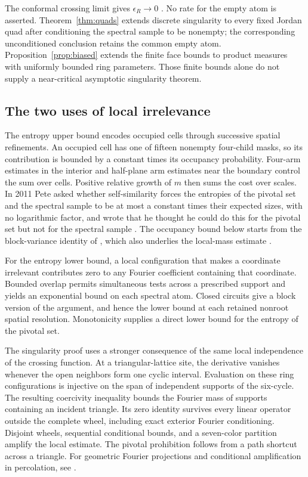 \documentclass[11pt]{amsart}
\theoremstyle{remark}
\begin{document}
The conformal crossing limit gives $\epsilon_R\to0$ \cite{Smirnov}. No rate for the empty atom is asserted. Theorem~\ref{thm:quads} extends discrete singularity to every fixed Jordan quad after conditioning the spectral sample to be nonempty; the corresponding unconditioned conclusion retains the common empty atom. Proposition~\ref{prop:biased} extends the finite face bounds to product measures with uniformly bounded ring parameters. Those finite bounds alone do not supply a near-critical asymptotic singularity theorem.

\subsection{The two uses of local irrelevance}

The entropy upper bound encodes occupied cells through successive spatial refinements. An occupied cell has one of fifteen nonempty four-child masks, so its contribution is bounded by a constant times its occupancy probability. Four-arm estimates in the interior and half-plane arm estimates near the boundary control the sum over cells. Positive relative growth of $m$ then sums the cost over scales. In 2011 Pete asked whether self-similarity forces the entropies of the pivotal set and the spectral sample to be at most a constant times their expected sizes, with no logarithmic factor, and wrote that he thought he could do this for the pivotal set but not for the spectral sample \cite[slides~21--22]{Pete}. The occupancy bound below starts from the block-variance identity of \cite[Lemma~2.2]{GPS}, which also underlies the local-mass estimate \cite[Lemma~3.2 and equation~(3.7)]{GPS}.

For the entropy lower bound, a local configuration that makes a coordinate irrelevant contributes zero to any Fourier coefficient containing that coordinate. Bounded overlap permits simultaneous tests across a prescribed support and yields an exponential bound on each spectral atom. Closed circuits give a block version of the argument, and hence the lower bound at each retained nonroot spatial resolution. Monotonicity supplies a direct lower bound for the entropy of the pivotal set.

The singularity proof uses a stronger consequence of the same local independence of the crossing function. At a triangular-lattice site, the derivative vanishes whenever the open neighbors form one cyclic interval. Evaluation on these ring configurations is injective on the span of independent supports of the six-cycle. The resulting coercivity inequality bounds the Fourier mass of supports containing an incident triangle. Its zero identity survives every linear operator outside the complete wheel, including exact exterior Fourier conditioning. Disjoint wheels, sequential conditional bounds, and a seven-color partition amplify the local estimate. The pivotal prohibition follows from a path shortcut across a triangle. For geometric Fourier projections and conditional amplification in percolation, see \cite[Lemma~4.3 and Propositions~5.1 and~6.1]{GPS}.
\end{document}
